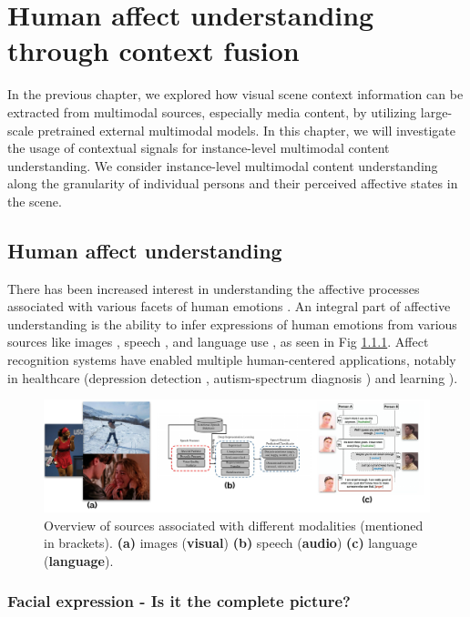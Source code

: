 \chapter{Human affect understanding through context fusion}
In the previous chapter, we explored how visual scene context information can be extracted from multimodal sources, especially media content, by utilizing large-scale pretrained external multimodal models. In this chapter, we will investigate the usage of contextual signals for instance-level multimodal content understanding. We consider instance-level multimodal content understanding along the granularity of individual persons and their perceived affective states in the scene. 
\section{Human affect understanding}
 There has been increased interest in understanding the affective processes associated with various facets of human emotions \cite{dukes2021}. An integral part of affective understanding is the ability to infer expressions of human emotions from various sources like images \cite{AICA}, speech \cite{speechemo}, and language use \cite{Poria2019EmotionRI}, as seen in Fig \ref{}. Affect recognition systems have enabled multiple human-centered applications, notably in healthcare (depression detection \cite{depressiondetection}, autism-spectrum diagnosis \cite{autismguha}) and learning \cite{savchecnkoengagement}).

\begin{figure}[h!]
    \centering
    \includegraphics[width=\textwidth]{figures/emotion_overview.pdf}
    \caption{Overview of sources associated with different modalities (mentioned in brackets). \textbf{(a)} images (\textbf{visual}) \textbf{(b)} speech (\textbf{audio}) \textbf{(c)} language (\textbf{language}).}
    \label{emotion overview}
\end{figure}

 
\subsection{Facial expression - Is it the complete picture?}

